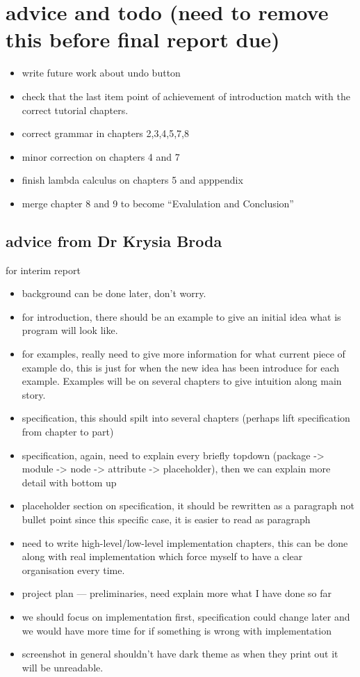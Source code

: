 \documentclass[master.tex]{subfiles}
\begin{document}
\section{advice and todo (need to remove this before final report due)}

\begin{itemize}
\item write future work about undo button
\item check that the last item point of achievement of introduction match with
  the correct tutorial chapters.
\item correct grammar in chapters 2,3,4,5,7,8
\item minor correction on chapters 4 and 7
\item finish lambda calculus on chapters 5 and apppendix
\item merge chapter 8 and 9 to become ``Evalulation and Conclusion''
\end{itemize}


\subsection{advice from Dr Krysia Broda}
for interim report
\begin{itemize}
  \item background can be done later, don't worry.
  \item for introduction, there should be an example to give an initial idea
    what is program will look like.
  \item for examples, really need to give more information for what current
    piece of example do, this is just for when the new idea has been introduce
    for each example. Examples will be on several chapters to give intuition
    along main story.
  \item specification, this should spilt into several chapters (perhaps lift
    specification from chapter to part)
  \item specification, again, need to explain every briefly topdown (package ->
    module -> node -> attribute -> placeholder),  then we can explain more
    detail with bottom up
  \item placeholder section on specification, it should be rewritten as a
    paragraph not bullet point since this specific case, it is easier to read
    as paragraph
  \item need to write high-level/low-level implementation chapters, this can be
    done along with real implementation which force myself to have a clear
    organisation every time.
  \item project plan --- preliminaries, need explain more what I have done so
    far
  \item we should focus on implementation first, specification could change
    later and we would have more time for if something is wrong with
    implementation
  \item screenshot in general shouldn't have dark theme as when they print out
    it will be unreadable.
\end{itemize}
\end{document}
